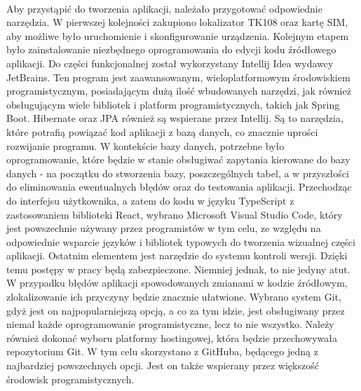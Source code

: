 \paragraph{}
Aby przystąpić do tworzenia aplikacji, należało przygotować odpowiednie narzędzia. W pierwszej kolejności zakupiono lokalizator TK108 oraz kartę SIM, aby możliwe było uruchomienie i skonfigurowanie urządzenia. Kolejnym etapem było zainstalowanie niezbędnego oprogramowania do edycji kodu źródłowego aplikacji. Do części funkcjonalnej został wykorzystany Intellij Idea wydawcy JetBrains. Ten program jest zaawansowanym, wieloplatformowym środowiskiem programistycznym, posiadającym dużą ilość wbudowanych narzędzi, jak również obsługującym wiele bibliotek i platform programistycznych, takich jak Spring Boot. Hibernate oraz JPA również są wspierane przez Intellij. Są to narzędzia, które potrafią powiązać kod aplikacji z bazą danych, co znacznie uprości rozwijanie programu. W kontekście bazy danych, potrzebne było oprogramowanie, które będzie w stanie obsługiwać zapytania kierowane do bazy danych - na początku do stworzenia bazy, poszczególnych tabel, a w przyszłości do eliminowania ewentualnych błędów oraz do testowania aplikacji. Przechodząc do interfejsu użytkownika, a zatem do kodu w języku TypeScript z zastosowaniem biblioteki React, wybrano Microsoft Visual Studio Code, który jest powszechnie używany przez programistów w tym celu, ze względu na odpowiednie wsparcie języków i bibliotek typowych do tworzenia wizualnej części aplikacji. Ostatnim elementem jest narzędzie do systemu kontroli wersji. Dzięki temu postępy w pracy będą zabezpieczone. Niemniej jednak, to nie jedyny atut. W przypadku błędów aplikacji spowodowanych zmianami w kodzie źródłowym, zlokalizowanie ich przyczyny będzie znacznie ułatwione. Wybrano system Git, gdyż jest on najpopularniejszą opcją, a co za tym idzie, jest obsługiwany przez niemal każde oprogramowanie programistyczne, lecz to nie wszystko. Należy również dokonać wyboru platformy hostingowej, która będzie przechowywała repozytorium Git. W tym celu skorzystano z GitHuba, będącego jedną z najbardziej powszechnych opcji. Jest on także wspierany przez większość środowisk programistycznych. 

